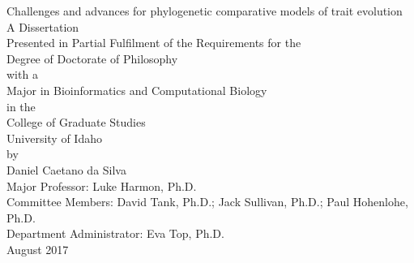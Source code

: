 \pagestyle{myheadings}

\thispagestyle{empty}

\begin{center}
Challenges and advances for phylogenetic comparative models of trait evolution\\
\vspace{48pt}
A Dissertation\\
Presented in Partial Fulfilment of the Requirements for the\\
Degree of Doctorate of Philosophy\\
with a\\
Major in Bioinformatics and Computational Biology\\
in the\\
College of Graduate Studies\\
University of Idaho\\
by\\
Daniel Caetano da Silva\\
\vspace{60pt}
Major Professor: Luke Harmon, Ph.D.\\
Committee Members: David Tank, Ph.D.; Jack Sullivan, Ph.D.; Paul Hohenlohe, Ph.D.\\
Department Administrator: Eva Top, Ph.D.\\
\vspace{80pt}
August 2017\\
\end{center}
\pagebreak

